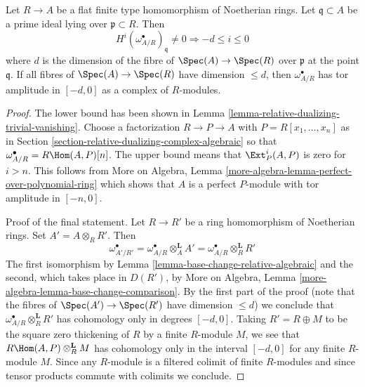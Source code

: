 \begin{lemma}
\label{lemma-relative-dualizing-flat-vanishing}
Let $R \to A$ be a flat finite type homomorphism of Noetherian rings.
Let $\mathfrak q \subset A$ be a prime ideal lying over
$\mathfrak p \subset R$. Then
$$
H^i(\omega_{A/R}^\bullet)_\mathfrak q \not = 0
\Rightarrow - d \leq i \leq 0
$$
where $d$ is the dimension of the fibre of $\Spec(A) \to \Spec(R)$
over $\mathfrak p$ at the point $\mathfrak q$. If all fibres of
$\Spec(A) \to \Spec(R)$ have dimension $\leq d$, then
$\omega_{A/R}^\bullet$ has tor amplitude in $[-d, 0]$
as a complex of $R$-modules.
\end{lemma}

\begin{proof}
The lower bound has been shown in
Lemma \ref{lemma-relative-dualizing-trivial-vanishing}.
Choose a factorization $R \to P \to A$ with $P = R[x_1, \ldots, x_n]$
as in Section \ref{section-relative-dualizing-complex-algebraic}
so that $\omega_{A/R}^\bullet = R\Hom(A, P)[n]$.
The upper bound means that $\Ext^i_P(A, P)$ is zero for $i > n$.
This follows from
More on Algebra, Lemma \ref{more-algebra-lemma-perfect-over-polynomial-ring}
which shows that $A$ is a perfect $P$-module with
tor amplitude in $[-n, 0]$.

\medskip\noindent
Proof of the final statement. Let $R \to R'$ be a ring homomorphism
of Noetherian rings. Set $A' = A \otimes_R R'$. Then
$$
\omega_{A'/R'}^\bullet =
\omega_{A/R}^\bullet \otimes_A^\mathbf{L} A' =
\omega_{A/R}^\bullet \otimes_R^\mathbf{L} R'
$$
The first isomorphism by Lemma \ref{lemma-base-change-relative-algebraic}
and the second, which takes place in $D(R')$, by
More on Algebra, Lemma \ref{more-algebra-lemma-base-change-comparison}.
By the first part of the proof
(note that the fibres of $\Spec(A') \to \Spec(R')$ have dimension $\leq d$)
we conclude that $\omega_{A/R}^\bullet \otimes_R^\mathbf{L} R'$
has cohomology only in degrees $[-d, 0]$. Taking $R' = R \oplus M$
to be the square zero thickening of $R$ by a finite $R$-module $M$,
we see that $R\Hom(A, P) \otimes_R^\mathbf{L} M$
has cohomology only in the interval $[-d, 0]$ for any finite $R$-module $M$.
Since any $R$-module is a filtered colimit of finite $R$-modules
and since tensor products commute with colimits we conclude.
\end{proof}